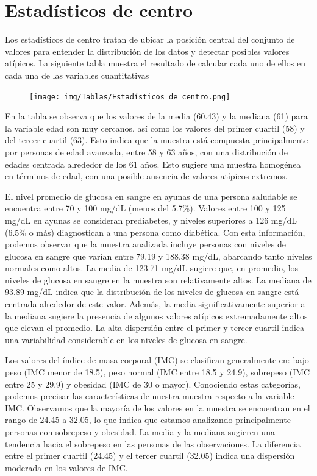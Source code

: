 \documentclass[a4paper, 12pt]{article}
\begin{document}
\newpage
\section{Estadísticos de centro}
Los estadísticos de centro tratan de ubicar la posición central del conjunto de valores
para entender la distribución de los datos y detectar posibles valores atípicos. La
siguiente tabla muestra el resultado de calcular cada uno de ellos en cada una de las
variables cuantitativas

\begin{figure}[H]
    \centering
    \texttt{[image: img/Tablas/Estadísticos\_de\_centro.png]}
\end{figure}

En la tabla se observa que los valores de la media (60.43) y la mediana (61) para la variable edad son muy cercanos, 
así como los valores del primer cuartil (58) y del tercer cuartil (63). Esto indica que la muestra está compuesta 
principalmente por personas de edad avanzada, entre 58 y 63 años, con una distribución de edades centrada alrededor 
de los 61 años. Esto sugiere una muestra homogénea en términos de edad, con una posible ausencia de 
valores atípicos extremos.

El nivel promedio de glucosa en sangre en ayunas de una persona saludable se encuentra entre 70 y 100 mg/dL 
(menos del 5.7\%). Valores entre 100 y 125 mg/dL en ayunas se consideran prediabetes, y niveles superiores a 126 mg/dL 
(6.5\% o más) diagnostican a una persona como diabética. Con esta información, podemos observar que la muestra analizada 
incluye personas con niveles de glucosa en sangre que varían entre 79.19 y 188.38 mg/dL, abarcando tanto niveles normales 
como altos. La media de 123.71 mg/dL sugiere que, en promedio, los niveles de glucosa en sangre en la muestra son 
relativamente altos. La mediana de 93.89 mg/dL indica que la distribución de los niveles de glucosa en sangre está centrada 
alrededor de este valor. Además, la media significativamente superior a la mediana sugiere la presencia de algunos valores 
atípicos extremadamente altos que elevan el promedio. La alta dispersión entre el primer y tercer cuartil indica una 
variabilidad considerable en los niveles de glucosa en sangre.

Los valores del índice de masa corporal (IMC) se clasifican generalmente en: bajo peso (IMC menor de 18.5), peso normal 
(IMC entre 18.5 y 24.9), sobrepeso (IMC entre 25 y 29.9) y obesidad (IMC de 30 o mayor). Conociendo estas categorías, 
podemos precisar las características de nuestra muestra respecto a la variable IMC. Observamos que la mayoría de los 
valores en la muestra se encuentran en el rango de 24.45 a 32.05, lo que indica que estamos analizando principalmente 
personas con sobrepeso y obesidad. La media y la mediana sugieren una tendencia hacia el sobrepeso en las personas 
de las observaciones. La diferencia entre el primer cuartil (24.45) y el tercer cuartil (32.05) indica una dispersión 
moderada en los valores de IMC.
\end{document}

